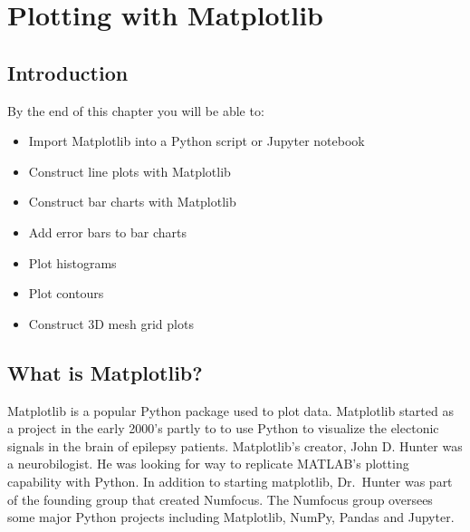 \documentclass{book}
\begin{document}
    
        \chapter{Plotting with Matplotlib}\label{plotting-with-matplotlib}
    




    
        \section{Introduction}\label{introduction}
    




    
        By the end of this chapter you will be able to:

\begin{itemize}
\item
  Import Matplotlib into a Python script or Jupyter notebook
\item
  Construct line plots with Matplotlib
\item
  Construct bar charts with Matplotlib
\item
  Add error bars to bar charts
\item
  Plot histograms
\item
  Plot contours
\item
  Construct 3D mesh grid plots
\end{itemize}
        \newpage



    




    
        \section{What is Matplotlib?}\label{what-is-matplotlib}
    




    
        Matplotlib is a popular Python package used to plot data. Matplotlib
started as a project in the early 2000's partly to to use Python to
visualize the electonic signals in the brain of epilepsy patients.
Matplotlib's creator, John D. Hunter was a neurobilogist. He was looking
for way to replicate MATLAB's plotting capability with Python. In
addition to starting matplotlib, Dr.~Hunter was part of the founding
group that created Numfocus. The Numfocus group oversees some major
Python projects including Matplotlib, NumPy, Pandas and Jupyter.
    
\end{document}
